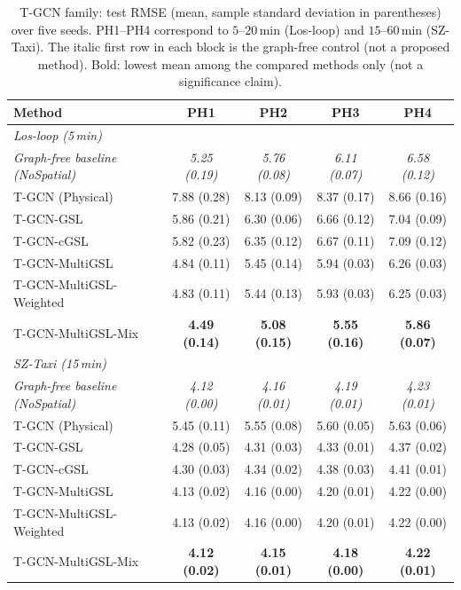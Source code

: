 \begin{table}[t]
\centering
\caption{T-GCN family: test RMSE (mean, sample standard deviation in
parentheses) over five seeds. PH1--PH4 correspond to $5$--$20$\,min
(Los-loop) and $15$--$60$\,min (SZ-Taxi). The italic first row in each block is the
graph-free control (not a proposed method). Bold: lowest mean among the
compared methods only (not a significance claim).}
\label{tab:tgcn-main}
\small
\begin{tabular}{lcccc}
\toprule
Method & PH1 & PH2 & PH3 & PH4 \\
\midrule
\multicolumn{5}{l}{\textit{Los-loop (5\,min)}} \\
\textit{Graph-free baseline (NoSpatial)} & \textit{5.25 (0.19)} & \textit{5.76 (0.08)} & \textit{6.11 (0.07)} & \textit{6.58 (0.12)} \\
\midrule
T-GCN (Physical) & 7.88 (0.28) & 8.13 (0.09) & 8.37 (0.17) & 8.66 (0.16) \\
T-GCN-GSL & 5.86 (0.21) & 6.30 (0.06) & 6.66 (0.12) & 7.04 (0.09) \\
T-GCN-cGSL & 5.82 (0.23) & 6.35 (0.12) & 6.67 (0.11) & 7.09 (0.12) \\
T-GCN-MultiGSL & 4.84 (0.11) & 5.45 (0.14) & 5.94 (0.03) & 6.26 (0.03) \\
T-GCN-MultiGSL-Weighted & 4.83 (0.11) & 5.44 (0.13) & 5.93 (0.03) & 6.25 (0.03) \\
T-GCN-MultiGSL-Mix & \textbf{4.49 (0.14)} & \textbf{5.08 (0.15)} & \textbf{5.55 (0.16)} & \textbf{5.86 (0.07)} \\
\midrule
\multicolumn{5}{l}{\textit{SZ-Taxi (15\,min)}} \\
\textit{Graph-free baseline (NoSpatial)} & \textit{4.12 (0.00)} & \textit{4.16 (0.01)} & \textit{4.19 (0.01)} & \textit{4.23 (0.01)} \\
\midrule
T-GCN (Physical) & 5.45 (0.11) & 5.55 (0.08) & 5.60 (0.05) & 5.63 (0.06) \\
T-GCN-GSL & 4.28 (0.05) & 4.31 (0.03) & 4.33 (0.01) & 4.37 (0.02) \\
T-GCN-cGSL & 4.30 (0.03) & 4.34 (0.02) & 4.38 (0.03) & 4.41 (0.01) \\
T-GCN-MultiGSL & 4.13 (0.02) & 4.16 (0.00) & 4.20 (0.01) & 4.22 (0.00) \\
T-GCN-MultiGSL-Weighted & 4.13 (0.02) & 4.16 (0.00) & 4.20 (0.01) & 4.22 (0.00) \\
T-GCN-MultiGSL-Mix & \textbf{4.12 (0.02)} & \textbf{4.15 (0.01)} & \textbf{4.18 (0.00)} & \textbf{4.22 (0.01)} \\
\bottomrule
\end{tabular}
\end{table}

